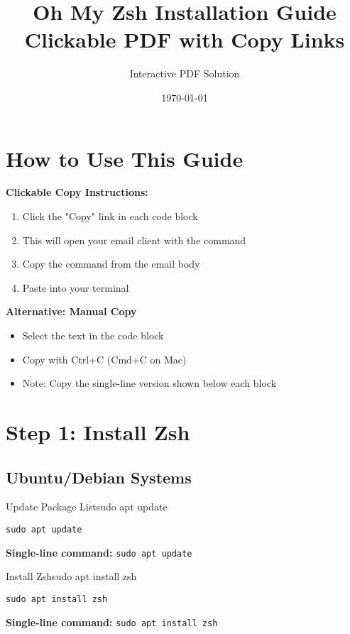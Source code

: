 \documentclass{article}
\title{Oh My Zsh Installation Guide\\
\large Clickable PDF with Copy Links}
\author{Interactive PDF Solution}
\date{\today}
\begin{document}
\maketitle

\section{How to Use This Guide}

\begin{infobox}
\textbf{Clickable Copy Instructions:}
\begin{enumerate}
    \item Click the "Copy" link in each code block
    \item This will open your email client with the command
    \item Copy the command from the email body
    \item Paste into your terminal
\end{enumerate}

\textbf{Alternative: Manual Copy}
\begin{itemize}
    \item Select the text in the code block
    \item Copy with Ctrl+C (Cmd+C on Mac)
    \item Note: Copy the single-line version shown below each block
\end{itemize}
\end{infobox}

\section{Step 1: Install Zsh}

\subsection{Ubuntu/Debian Systems}

\begin{clickablecode}{Update Package List}{sudo apt update}
\begin{lstlisting}
sudo apt update
\end{lstlisting}
\textbf{Single-line command:} \texttt{sudo apt update}
\end{clickablecode}

\begin{clickablecode}{Install Zsh}{sudo apt install zsh}
\begin{lstlisting}
sudo apt install zsh
\end{lstlisting}
\textbf{Single-line command:} \texttt{sudo apt install zsh}
\end{clickablecode}
\end{document}
